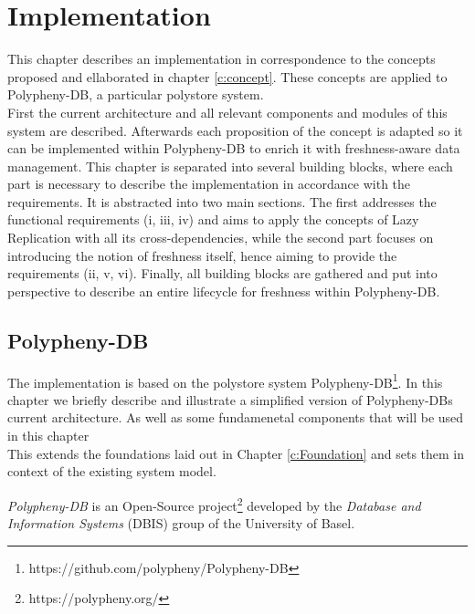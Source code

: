 \chapter{Implementation}
\label{c:implementation}

This chapter describes an implementation in correspondence to the concepts proposed and ellaborated in chapter \ref{c:concept}. 
These concepts are applied to Polypheny-DB, a particular polystore system.\\
First the current architecture and all relevant components and modules of this system are described. Afterwards each proposition of the concept is adapted
so it can be implemented within Polypheny-DB to enrich it with freshness-aware data management.
This chapter is separated into several building blocks, where each part is necessary to describe the implementation in accordance with the requirements.
It is abstracted into two main sections. The first addresses the functional requirements (i, iii, iv) and aims to apply the concepts of Lazy Replication with all its
cross-dependencies, while the second part focuses on introducing the notion of freshness itself, hence aiming to provide the requirements (ii, v, vi).
Finally, all building blocks are gathered and put into perspective to describe an entire lifecycle for freshness within Polypheny-DB. 





\section{Polypheny-DB}
\label{sec:architecture}


The implementation is based on the polystore system Polypheny-DB\footnote{https://github.com/polypheny/Polypheny-DB}.
In this chapter we briefly describe and illustrate a simplified version of Polypheny-DBs current architecture.
As well as some fundamenetal components that will be used in this chapter\\
This extends the foundations laid out in Chapter \ref{c:Foundation} and sets them in context of the existing system model.




\emph{Polypheny-DB} is an Open-Source project\footnote{https://polypheny.org/} developed by 
the \textit{Database and Information Systems} (DBIS) group of the University of Basel.\\

